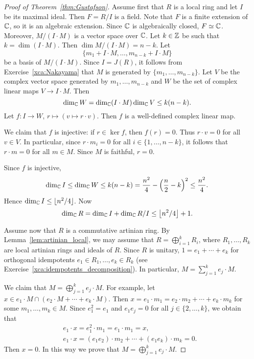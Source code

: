 \begin{proof}[Proof of Theorem~\ref{thm:Gustafson}]
    Assume first that $R$ is a local ring and let $I$ be its maximal ideal. Then 
    $F=R/I$ is a field. Note that $F$ is a finite extension of $\mathbb{C}$, so it is an algebraic extension. 
    Since $\mathbb{C}$ is algebraically closed, $F\simeq\mathbb{C}$. Moreover, 
    $M/(I\cdot M)$ is a vector space over $\mathbb{C}$. 
    Let $k\in\mathbb{Z}$ be such that 
    $k=\dim (I\cdot M)$. Then 
    $\dim M/(I\cdot M)=n-k$. Let  
    \[
        \{m_1+I\cdot M,\dots,m_{n-k} +I\cdot M\}
    \]
    be a basis of $M/(I\cdot M)$. 
    Since $I=J(R)$, it follows from Exercise~\ref{xca:Nakayama} that $M$ is generated by 
    $\{m_1,\dots,m_{n-k}\}$. Let $V$ be the complex vector space 
    generated by $m_1,\dots,m_{n-k}$ and $W$ be the set of complex linear maps 
    $V\to I\cdot M$. Then 
    \[
    \dim_{\mathbb{C}}W=\dim_{\mathbb{C}}(I\cdot M)\dim_{\mathbb{C}}V\leq k(n-k).
    \]
    Let $f\colon I\to W$, $r\mapsto (v\mapsto r\cdot v)$. Then $f$ is a well-defined complex linear map. 
    
    We claim that 
    $f$ is injective: if $r\in\ker f$, then $f(r)=0$. Thus $r\cdot v=0$ for all $v\in V$. In particular, since 
    $r\cdot m_i=0$ for all $i\in\{1,\dots,n-k\}$, it follows that $r\cdot m=0$ for all $m\in M$. 
    Since $M$ is faithful, $r=0$. 

    Since $f$ is injective, 
    \[
    \dim_{\mathbb{C}} I\leq\dim_{\mathbb{C}}W\leq k(n-k)=\frac{n^2}{4}-\left(\frac{n}{2}-k\right)^2\leq\frac{n^2}{4}.
    \]
    Hence $\dim_{\mathbb{C}}I\leq\lfloor n^2/4\rfloor$. Now 
    \[
    \dim_{\mathbb{C}}R=\dim_{\mathbb{C}}I+\dim_{\mathbb{C}}R/I\leq \left\lfloor n^2/4\right\rfloor+1. 
    \]

    Assume now that $R$ is a commutative artinian ring. By Lemma~\ref{lem:artinian_local}, we may assume
    that $R=\bigoplus_{i=1}^k R_i$, where $R_1,\dots,R_k$ are local artinian rings and ideals of $R$. Since $R$ is unitary, $1=e_1+\cdots+e_k$ 
    for orthogonal idempotents $e_1\in R_1,\dots,e_k\in R_k$ 
    (see Exercise~\ref{xca:idempotents_decomposition}). 
    In particular,  
    $M=\sum_{j=1}^k e_j\cdot M$. 

    We claim that $M=\bigoplus_{j=1}^k e_j\cdot M$. For example, let $x\in e_1\cdot M\cap (e_2\cdot M+\cdots+e_k\cdot M)$. Then 
    $x=e_1\cdot m_1=e_2\cdot m_2+\cdots+e_k\cdot m_k$ 
    for some $m_1,\dots,m_k\in M$. Since $e_1^2=e_1$ and 
    $e_1e_j=0$ for all $j\in\{2,\dots,k\}$, we obtain that 
    \begin{align*}
        &e_1\cdot x=e_1^2\cdot m_1=e_1\cdot m_1=x,\\
        &e_1\cdot x=(e_1e_2)\cdot m_2+\cdots+(e_1e_k)\cdot m_k=0.
    \end{align*}
    Then $x=0$. In this way we prove that $M=\bigoplus_{j=1}^k e_j\cdot M$. 
    

\end{proof}
